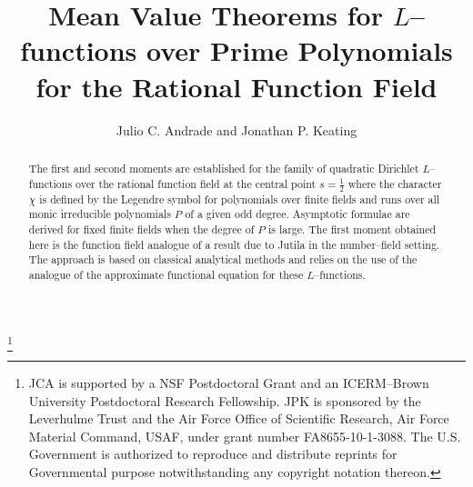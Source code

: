 \documentclass[11pt]{amsart}
\begin{document}
\newtheorem{thm}{Theorem}[section]
\newtheorem{lem}[thm]{Lemma}
\newtheorem{prop}[thm]{Proposition}
\newtheorem{cor}[thm]{Corollary}
\newtheorem{defi}[thm]{Definition}
\newtheorem{remark}[thm]{Remark}
\newtheorem{conj}[thm]{Conjecture}
\newtheorem{problem}[thm]{Problem}


 

 

 

 

 
  

 

 

\title[Mean Value Theorems for $L$--functions over Prime Polynomials]{Mean Value Theorems for $L$--functions over Prime Polynomials for the Rational Function Field}

\author{Julio C. Andrade and Jonathan P. Keating}
\address{Institute for Computational and Experimental Research in Mathematics (ICERM), Brown University, 121 South Main Street, Providence, RI, 02903, USA}

\address{School of Mathematics, University of Bristol, Bristol BS8 1TW, UK}

\thanks{JCA is supported by a NSF Postdoctoral Grant and an ICERM--Brown University Postdoctoral Research Fellowship. JPK is sponsored by the Leverhulme Trust and the Air Force Office of Scientific Research, Air Force Material Command, USAF, under grant number FA8655-10-1-3088. The U.S. Government is authorized to reproduce and distribute reprints for Governmental purpose notwithstanding any copyright notation thereon.}

\begin{abstract}
The first and second moments are established for the family of quadratic Dirichlet $L$--functions over the rational function field at the central point $s=\tfrac{1}{2}$ where the character $\chi$ is defined by the Legendre symbol for polynomials over finite fields and runs over all monic irreducible polynomials $P$ of a given odd degree. Asymptotic formulae are derived for fixed finite fields when the degree of $P$ is large. The first moment obtained here is the function field analogue of a result due to Jutila in the number--field setting. The approach is based on classical analytical methods and relies on the use of the analogue of the approximate functional equation for these $L$--functions. 
\end{abstract}
\end{document}
